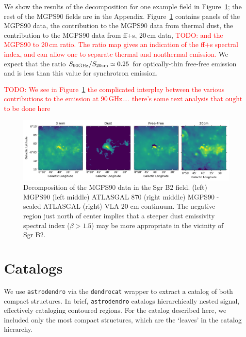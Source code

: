 \documentclass[twocolumn]{aastex62}
\def\todo#1{{\textcolor{red}{TODO: #1}}}
\begin{document}
We show the results of the decomposition for one example field in
Figure~\ref{fig:sgrb2_freefree}; the rest of the MGPS90 fields are in the
Appendix.  Figure~\ref{fig:sgrb2_freefree} contains panels of the MGPS90 data,
the contribution to the MGPS90 data from thermal dust, the contribution to the
MGPS90 data from ff+s, 20\,cm data, \todo{and the MGPS90 to 20\,cm ratio.  The ratio
map  gives an indication of the ff+s spectral index, and can allow one to
separate thermal and nonthermal emission.}  We expect that the ratio $S_{\rm
90GHz}/S_{\rm 20cm} \simeq 0.25$ for optically-thin free-free emission and is
less than this value for synchrotron emission.

\todo{
We see in Figure~\ref{fig:sgrb2_freefree} the complicated interplay between the
various contributions to the emission at 90\,GHz....
there's some text analysis that ought to be done here
}


\begin{figure}[htp]
    \includegraphics[width=17cm]{figures/G01_sgrb2.pdf}
    \caption{Decomposition of the MGPS90 data in the Sgr B2 field.  (left)
    MGPS90 (left middle) ATLASGAL 870 \um  (right middle) MGPS90 - scaled
    ATLASGAL (right) VLA 20 cm continuum.  The negative region just north
    of center implies that a steeper dust emissivity spectral index
    ($\beta>1.5$) may be more appropriate in the vicinity of Sgr B2.}
\label{fig:sgrb2_freefree}
\end{figure}

\section{Catalogs}

We use \texttt{astrodendro} via the \texttt{dendrocat} wrapper to extract a
catalog of both compact structures.  In brief, \texttt{astrodendro} catalogs
hierarchically nested signal, effectively cataloging contoured regions.  For
the catalog described here, we included only the most compact structures, which
are the `leaves' in the catalog hierarchy.
\end{document}
